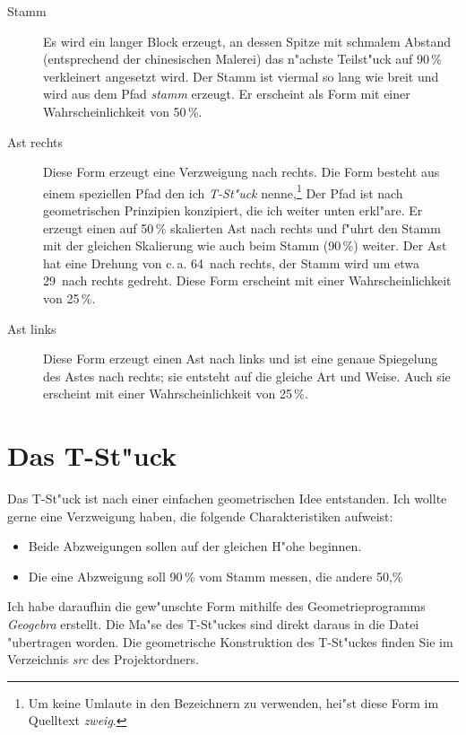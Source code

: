 \documentclass{scrreprt}
\begin{document}
\begin{description}
\item[Stamm] Es wird ein langer Block erzeugt, an dessen Spitze mit schmalem
  Abstand (entsprechend der chinesischen Malerei) das n"achste Teilst"uck
  auf 90\,\% verkleinert angesetzt wird.  Der Stamm ist viermal so lang wie
  breit und wird aus dem Pfad \emph{stamm} erzeugt. Er erscheint als Form mit
  einer Wahrscheinlichkeit von 50\,\%. 
  
\item[Ast rechts] Diese Form erzeugt eine Verzweigung nach rechts.  Die Form
  besteht aus einem speziellen Pfad den ich \emph{T-St"uck} nenne,\footnote{Um
  keine Umlaute in den Bezeichnern zu verwenden, hei"st diese Form im Quelltext
  \emph{zweig}.} Der Pfad ist nach geometrischen Prinzipien konzipiert, die ich
  weiter unten erkl"are.  Er erzeugt einen auf 50\,\% skalierten Ast nach rechts
  und f"uhrt den Stamm mit der gleichen Skalierung wie auch beim Stamm (90\,\%)
  weiter.  Der Ast hat eine Drehung von c.\,a. 64\textdegree\ nach rechts, der
  Stamm wird um etwa 29\textdegree\ nach rechts gedreht.  Diese Form erscheint
  mit einer Wahrscheinlichkeit von 25\,\%.

\item[Ast links] Diese Form erzeugt einen Ast nach links und ist eine genaue
  Spiegelung des Astes nach rechts; sie entsteht auf die gleiche Art und Weise.
  Auch sie erscheint mit einer Wahrscheinlichkeit von 25\,\%.
\end{description}

\section{Das T-St"uck}

Das T-St"uck ist nach einer einfachen geometrischen Idee entstanden.  Ich wollte
gerne eine Verzweigung haben, die folgende Charakteristiken aufweist:
\begin{itemize}
\item Beide Abzweigungen sollen auf der gleichen H"ohe beginnen.
\item Die eine Abzweigung soll 90\,\% vom Stamm messen, die andere 50,\%
\end{itemize}
Ich habe daraufhin die gew"unschte Form mithilfe des Geometrieprogramms \emph
{Geogebra} erstellt.  Die Ma"se des T-St"uckes sind direkt daraus in die Datei
"ubertragen worden.  Die geometrische Konstruktion des T-St"uckes finden Sie im
Verzeichnis \emph{src} des Projektordners.
\end{document}
